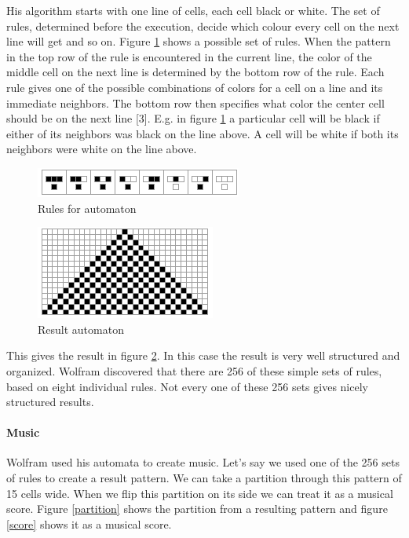 \documentclass[12pt]{article}
\begin{document}
His algorithm starts with one line of cells, each cell black or white. The set of rules, determined before the execution, decide which colour every cell on the next line will get and so on. Figure \ref{rules} shows a possible set of rules. When the pattern in the top row of the rule is encountered in the current line, the color of the middle cell on the next line is determined by the bottom row of the rule. Each rule gives one of the possible combinations of colors for a cell on a line and its immediate neighbors. The bottom row then specifies what color the center cell should be on the next line [3]. E.g. in figure \ref{rules} a particular cell will be black if either of its neighbors was black on the line above. A cell will be white if both its neighbors were white on the line above.

\begin{figure}[h]
\centering
\includegraphics[]{img/wolframRules}
\caption{Rules for automaton}
\label{rules}
\end{figure}

\begin{figure}[h]
\centering
\includegraphics[]{img/wolframResult-15}
\caption{Result automaton}
\label{resultautomaton}
\end{figure}

This gives the result in figure \ref{resultautomaton}. In this case the result is very well structured and organized. Wolfram discovered that there are 256 of these simple sets of rules, based on eight individual rules. Not every one of these 256 sets gives nicely structured results.

\paragraph{Music}

Wolfram used his automata to create music. Let's say we used one of the 256 sets of rules to create a result pattern. We can take a partition through this pattern of 15 cells wide. When we flip this partition on its side we can treat it as a musical score.
Figure \ref{partition} shows the partition from a resulting pattern and figure \ref{score} shows it as a musical score.
\newline
\end{document}
